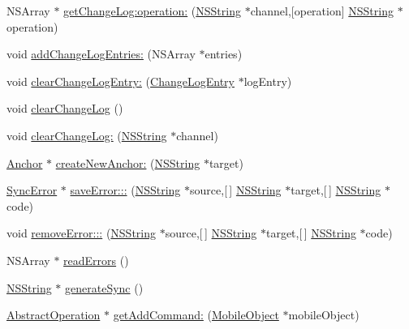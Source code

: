 \begin{DoxyCompactItemize}
\item 
\-N\-S\-Array $\ast$ \hyperlink{interface_sync_engine_a506d4ed2470f7f6654a279ca816480b5}{get\-Change\-Log\-:operation\-:} (\hyperlink{class_n_s_string}{\-N\-S\-String} $\ast$channel,\mbox{[}operation\mbox{]} \hyperlink{class_n_s_string}{\-N\-S\-String} $\ast$operation)
\item 
void \hyperlink{interface_sync_engine_ae5f3fe9c9d4b58f991a4f13b2d27afb0}{add\-Change\-Log\-Entries\-:} (\-N\-S\-Array $\ast$entries)
\item 
void \hyperlink{interface_sync_engine_ad60a21dc70c02440080ba17d7973e07a}{clear\-Change\-Log\-Entry\-:} (\hyperlink{interface_change_log_entry}{\-Change\-Log\-Entry} $\ast$log\-Entry)
\item 
void \hyperlink{interface_sync_engine_aa4e0a5df792b321106e8313cc1d33564}{clear\-Change\-Log} ()
\item 
void \hyperlink{interface_sync_engine_a9233826cf0626c0dcd4136f93014222d}{clear\-Change\-Log\-:} (\hyperlink{class_n_s_string}{\-N\-S\-String} $\ast$channel)
\item 
\hyperlink{interface_anchor}{\-Anchor} $\ast$ \hyperlink{interface_sync_engine_a011e288426526cef8ddcefc18759065b}{create\-New\-Anchor\-:} (\hyperlink{class_n_s_string}{\-N\-S\-String} $\ast$target)
\item 
\hyperlink{interface_sync_error}{\-Sync\-Error} $\ast$ \hyperlink{interface_sync_engine_a01993c323f1ecb36e42243ac66452110}{save\-Error\-:::} (\hyperlink{class_n_s_string}{\-N\-S\-String} $\ast$source,\mbox{[}$\,$\mbox{]} \hyperlink{class_n_s_string}{\-N\-S\-String} $\ast$target,\mbox{[}$\,$\mbox{]} \hyperlink{class_n_s_string}{\-N\-S\-String} $\ast$code)
\item 
void \hyperlink{interface_sync_engine_a40449d9ce7ba8e48724cb7afc79bb174}{remove\-Error\-:::} (\hyperlink{class_n_s_string}{\-N\-S\-String} $\ast$source,\mbox{[}$\,$\mbox{]} \hyperlink{class_n_s_string}{\-N\-S\-String} $\ast$target,\mbox{[}$\,$\mbox{]} \hyperlink{class_n_s_string}{\-N\-S\-String} $\ast$code)
\item 
\-N\-S\-Array $\ast$ \hyperlink{interface_sync_engine_a4e75e7f900781c5c90a5f67363eca491}{read\-Errors} ()
\item 
\hyperlink{class_n_s_string}{\-N\-S\-String} $\ast$ \hyperlink{interface_sync_engine_a8a1caa5be1ad1c062fee5b72808381c8}{generate\-Sync} ()
\item 
\hyperlink{interface_abstract_operation}{\-Abstract\-Operation} $\ast$ \hyperlink{interface_sync_engine_a2303b3b9b8aab7e98a20fd328f11eadb}{get\-Add\-Command\-:} (\hyperlink{interface_mobile_object}{\-Mobile\-Object} $\ast$mobile\-Object)

\end{DoxyCompactItemize}
